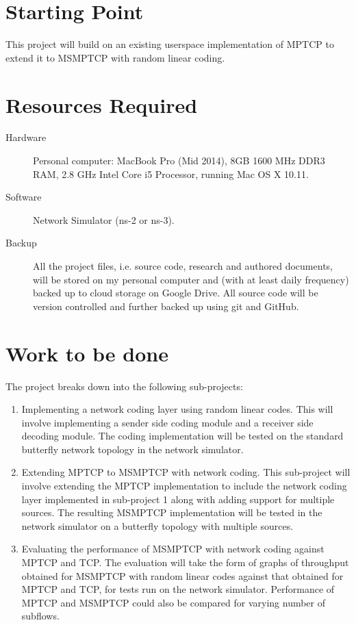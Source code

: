 \documentclass[12pt,a4paper,twoside]{article}
\begin{document}
\section*{Starting Point}

This project will build on an existing userspace implementation of MPTCP to extend it to MSMPTCP with random linear coding.

\section*{Resources Required}

\begin{description}
  \item[Hardware] Personal computer: MacBook Pro (Mid 2014), 8GB 1600 MHz DDR3 RAM, 2.8 GHz Intel Core i5 Processor, running Mac OS X 10.11.
  \item[Software] Network Simulator (ns-2 or ns-3).
  \item[Backup] All the project files, i.e. source code, research and authored documents, will be stored on my personal computer and (with at least daily frequency) backed up to cloud storage on Google Drive. All source code will be version controlled and further backed up using git and GitHub.
\end{description}

\section*{Work to be done}

The project breaks down into the following sub-projects:

\begin{enumerate}
  \item Implementing a network coding layer using random linear codes. This will involve implementing a sender side coding module and a receiver side decoding module. The coding implementation will be tested on the standard butterfly network topology in the network simulator. 
  \item Extending MPTCP to MSMPTCP with network coding. This sub-project will involve extending the MPTCP implementation to include the network coding layer implemented in sub-project 1 along with adding support for multiple sources. The resulting MSMPTCP implementation will be tested in the network simulator on a butterfly topology with multiple sources. 
  \item Evaluating the performance of MSMPTCP with network coding against MPTCP and TCP. The evaluation will take the form of graphs of throughput obtained for MSMPTCP with random linear codes against that obtained for MPTCP and TCP, for tests run on the network simulator. Performance of MPTCP and MSMPTCP could also be compared for varying number of subflows. 
\end{enumerate}
\end{document}
